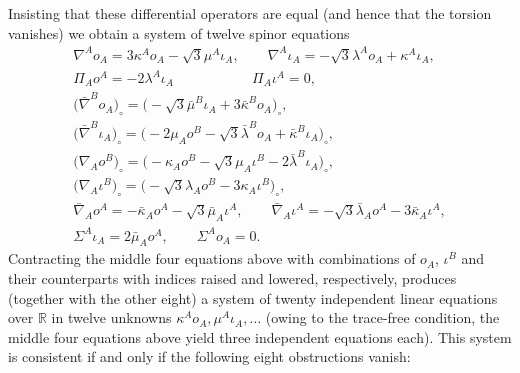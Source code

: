 \documentclass[pdftex]{sigma}%
\numberwithin{equation}{section}
\begin{document}
Insisting that these differential operators are equal (and hence that the
torsion vanishes) we obtain a system of twelve spinor equations
\begin{gather*}
\nabla^Ao_A = 3\kappa^Ao_A - \sqrt{3}\mu^A\iota_A,
\qquad \nabla^A\iota_A = -\sqrt{3}\lambda^Ao_A + \kappa^A\iota_A, \\	
\Pi_Ao^A = -2\lambda^A\iota_A \hspace{67pt} \Pi_A\iota^A = 0, \\
 \big(\bar{\nabla}^Bo_A\big)_\circ
 = \big({-} \sqrt{3}\bar{\mu}^B\iota_A + 3\bar{\kappa}^Bo_A\big)_\circ,\\
\big(\bar{\nabla}^B\iota_A\big)_\circ
 = \big({-}2\mu_Ao^B - \sqrt{3}\bar{\lambda}^Bo_A + \bar{\kappa}^B\iota_A\big)_\circ, \\
\big(\nabla_Ao^B\big)_\circ
 = \big({-}\kappa_Ao^B - \sqrt{3}\mu_A\iota^B - 2\bar{\lambda}^B\iota_A\big)_\circ, \\
\big(\nabla_A\iota^B\big)_\circ
 = \big({-} \sqrt{3}\lambda_Ao^B - 3\kappa_A\iota^B \big)_\circ, \\
\bar{\nabla}_Ao^A
 = - \bar{\kappa}_Ao^A - \sqrt{3}\bar{\mu}_A\iota^A,\qquad
\bar{\nabla}_A\iota^A
 = -\sqrt{3}\bar{\lambda}_Ao^A - 3\bar{\kappa}_A\iota^A, \\
\Sigma^A\iota_A = 2\bar{\mu}_Ao^A, \qquad \Sigma^Ao_A = 0 .
\end{gather*}
Contracting the middle four equations above with combinations of
$o_A$, $\iota^B$ and their counterparts with indices raised and lowered,
respectively, produces (together with the other eight) a system of twenty
independent linear equations over $\mathbb{R}$ in twelve unknowns $\kappa^A
o_A, \mu^A\iota_A, \dots $ (owing to the trace-free condition, the middle four
equations above yield three independent equations each). This system
is consistent if and only if the following eight obstructions vanish:
\end{document}
